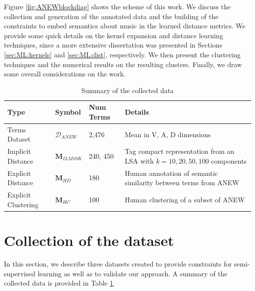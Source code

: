 Figure \ref{fig:ANEWblockdiag} shows the scheme of this work. We discuss the collection and generation of the annotated data and the building of the constraints to embed semantics about music in the learned distance metrics. We provide some quick details on the kernel expansion and distance learning techniques, since a more extensive dissertation was presented in Sections \ref{sec:ML:kernels} and \ref{sec:ML:dist}, respectively. We then present the clustering techniques and the numerical results on the resulting clusters. Finally, we draw some overall considerations on the work.


\begin{table}
\begin{center}
\bgroup
\def\arraystretch{1.5}
\begin{tabular}{ ||p{} |l |p{}  |p{}||}
\hline
\hline
Type &  Symbol & Num Terms & Details \\
\hline
\hline
Terms Dataset  &$\mathcal{D}_{ANEW} $ %
& 2,476 & Mean in V, A, D dimensions\\
\hline
Implicit Distance  &$\mathbf{M}_{ILM10K}$& 240, 450 & Tag compact representation from an LSA with $k=10,20,50,100$ components\\
\hline
Explicit Distance  & $\mathbf{M}_{HD} $ & 180 & Human annotation of semantic similarity between terms from ANEW\\
\hline
Explicit Clustering  & $\mathbf{M}_{HC} $ & 100 & Human clustering of a subset of ANEW\\
\hline
\hline
\end{tabular}\quad
\egroup
\end{center}
\caption{Summary of the collected data}
\label{tab:ANEWdata}
\end{table}


\section{Collection of the dataset}\label{sec:ANEW:data}
In this section, we describe three datasets created to provide constraints for semi-supervised learning as well as to validate our approach. A summary of the collected data is provided in Table \ref{tab:ANEWdata}.

